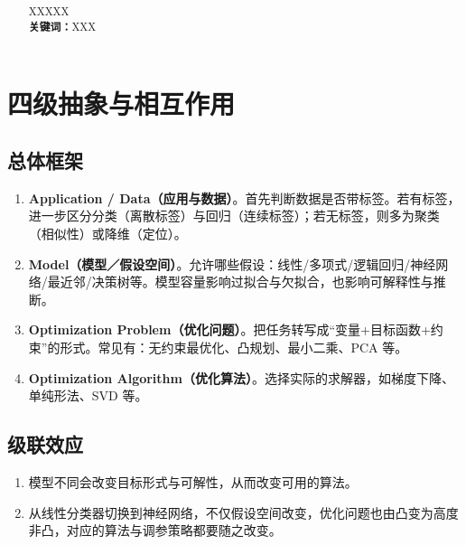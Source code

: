 \documentclass[10.5pt,hyperref,a4paper,UTF8]{ctexart}
\theoremstyle{definition}
\begin{document}
\cover

\begin{abstract}
%
XXXXX\\
\textbf{关键词：}XXX
%
\end{abstract}

\newpage
\tableofcontents
\thispagestyle{empty} %

\newpage
\setcounter{page}{1} %

\begin{center}
    \title{ \Huge \textbf{} }
\end{center}


\thispagestyle{empty} %


\section{四级抽象与相互作用}

\subsection{总体框架}
\begin{enumerate}
  \item \textbf{Application / Data（应用与数据）}。首先判断数据是否带标签。若有标签，进一步区分分类（离散标签）与回归（连续标签）；若无标签，则多为聚类（相似性）或降维（定位）。
  \item \textbf{Model（模型／假设空间）}。允许哪些假设：线性/多项式/逻辑回归/神经网络/最近邻/决策树等。模型容量影响过拟合与欠拟合，也影响可解释性与推断。
  \item \textbf{Optimization Problem（优化问题）}。把任务转写成“变量+目标函数+约束”的形式。常见有：无约束最优化、凸规划、最小二乘、PCA 等。
  \item \textbf{Optimization Algorithm（优化算法）}。选择实际的求解器，如梯度下降、单纯形法、SVD 等。
\end{enumerate}

\subsection{级联效应}
\begin{enumerate}
  \item 模型不同会改变目标形式与可解性，从而改变可用的算法。
  \item 从线性分类器切换到神经网络，不仅假设空间改变，优化问题也由凸变为高度非凸，对应的算法与调参策略都要随之改变。
\end{enumerate}
\end{document}
